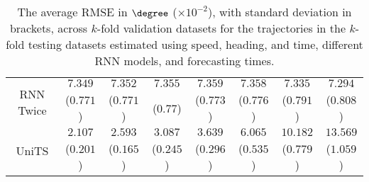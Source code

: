 \begin{table}[!ht]
{\begin{tabular}{|c|c|c|c|c|c|c|c|}
			\multirow{2}{*}{RNN Twice} & $7.349$ & $7.352$ & $7.355$ & $7.359$ & $7.358$ & $7.335$ & $7.294$ \\
			 & ($0.771$) & ($0.771$) & ($0.77$) & ($0.773$) & ($0.776$) & ($0.791$) & ($0.808$) \\ \hline
			\multirow{2}{*}{UniTS} & $2.107$ & $2.593$ & $3.087$ & $3.639$ & $6.065$ & $10.182$ & $13.569$ \\
			 & ($0.201$) & ($0.165$) & ($0.245$) & ($0.296$) & ($0.535$) & ($0.779$) & ($1.059$) \\ \hline
		\end{tabular}
	}
	\caption{The average RMSE in $\degree$ ($\times 10^{-2}$), with standard deviation in brackets, across $k$-fold validation datasets for the trajectories in the $k$-fold testing datasets estimated using speed, heading, and time, different RNN models, and forecasting times.}
	\label{tab:all_speed_actual_dir_RMSE}
\end{table}